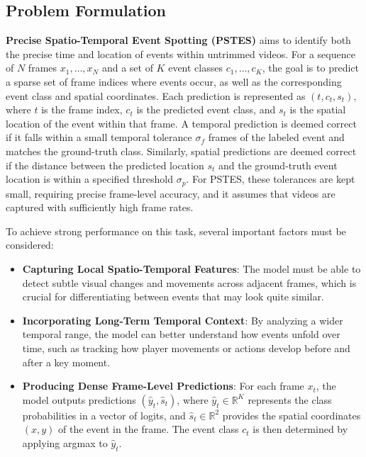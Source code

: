 \documentclass[conference]{IEEEtran}
\begin{document}
\subsection{Problem Formulation}
\textbf{Precise Spatio-Temporal Event Spotting (PSTES)} aims to identify both the precise time and location of events within untrimmed videos. For a sequence of \(N\) frames \(x_1, \ldots, x_N\) and a set of \(K\) event classes \(c_1, \ldots, c_K\), the goal is to predict a sparse set of frame indices where events occur, as well as the corresponding event class and spatial coordinates. Each prediction is represented as \((t, c_t, s_t)\), where \(t\) is the frame index, \(c_t\) is the predicted event class, and \(s_t\) is the spatial location of the event within that frame. A temporal prediction is deemed correct if it falls within a small temporal tolerance \(\sigma_f\) frames of the labeled event and matches the ground-truth class. Similarly, spatial predictions are deemed correct if the distance between the predicted location \(s_t\) and the ground-truth event location is within a specified threshold \(\sigma_p\). For PSTES, these tolerances are kept small, requiring precise frame-level accuracy, and it assumes that videos are captured with sufficiently high frame rates.

To achieve strong performance on this task, several important factors must be considered:

\begin{itemize}
    \item \textbf{Capturing Local Spatio-Temporal Features}: The model must be able to detect subtle visual changes and movements across adjacent frames, which is crucial for differentiating between events that may look quite similar.
    \item \textbf{Incorporating Long-Term Temporal Context}: By analyzing a wider temporal range, the model can better understand how events unfold over time, such as tracking how player movements or actions develop before and after a key moment.
    \item \textbf{Producing Dense Frame-Level Predictions}: For each frame \(x_t\), the model outputs predictions \((\hat{y}_t, \hat{s}_t)\), where \(\hat{y}_t \in \mathbb{R}^K\) represents the class probabilities in a vector of logits, and \(\hat{s}_t \in \mathbb{R}^2\) provides the spatial coordinates \((x, y)\) of the event in the frame. The event class \(c_t\) is then determined by applying argmax to \(\hat{y}_t\).
\end{itemize}
\end{document}
